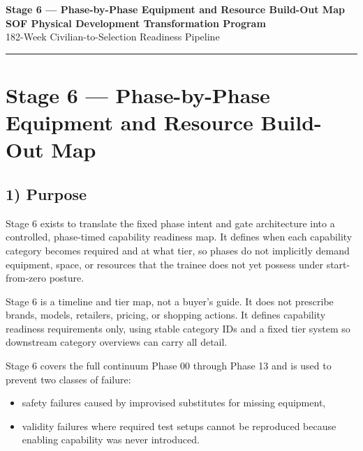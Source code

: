 \documentclass[10pt]{article}
\newcommand{\TitleLine}{\textcolor{StageBlue}{\rule{0.98\linewidth}{0.95pt}}}
\begin{document}
\begin{tcolorbox}
\begin{center}
{\LARGE\bfseries Stage 6 — Phase-by-Phase Equipment and Resource Build-Out Map}\\[0.35em]
{\Large\bfseries SOF Physical Development Transformation Program}\\[0.25em]
{\large 182-Week Civilian-to-Selection Readiness Pipeline}\\[0.65em]
\TitleLine
\end{center}
\end{tcolorbox}

\vspace{0.35em}

\section*{Stage 6 — Phase-by-Phase Equipment and Resource Build-Out Map}
{}

\subsection*{1) Purpose}
{}

Stage 6 exists to translate the fixed phase intent and gate architecture into a controlled, phase-timed capability readiness map. It defines when each capability category becomes required and at what tier, so phases do not implicitly demand equipment, space, or resources that the trainee does not yet possess under start-from-zero posture.

Stage 6 is a timeline and tier map, not a buyer’s guide. It does not prescribe brands, models, retailers, pricing, or shopping actions. It defines capability readiness requirements only, using stable category IDs and a fixed tier system so downstream category overviews can carry all detail.

Stage 6 covers the full continuum Phase 00 through Phase 13 and is used to prevent two classes of failure:

\begin{itemize}
\item safety failures caused by improvised substitutes for missing equipment,
\item validity failures where required test setups cannot be reproduced because enabling capability was never introduced.
\end{itemize}
\end{document}
